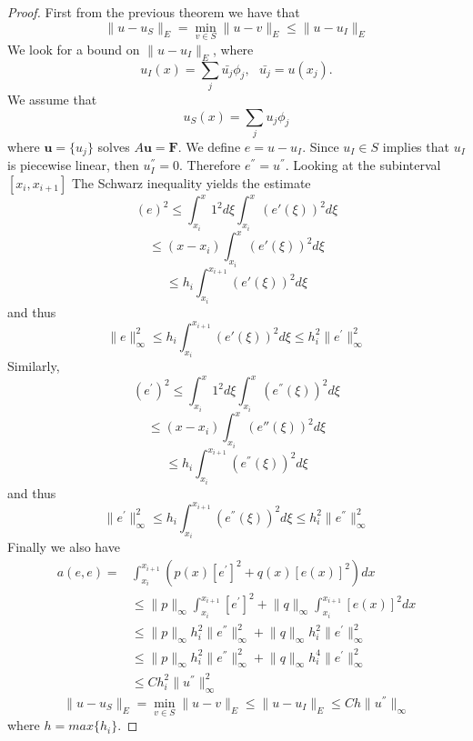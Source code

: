 \begin{proof}
First from the previous theorem we have that
\[\lVert u-u_S\rVert_E = \min_{v\in S}\lVert u-v\rVert_E \leq \lVert u-u_I\rVert_E\]
We look for a bound on $\lVert u-u_I\rVert_E$, where 
\[u_{I}(x) = \sum_j \bar{u_j} \phi_j, \ \ \ \bar{u_j}=u(x_j). \]
We assume that 
\[u_{S}(x) = \sum_j u_j \phi_j\] 
where $\mathbf{u}=\{u_j\}$ solves $A\mathbf{u}=\mathbf{F}$.
We define $e=u-u_I$. Since $u_I\in S$ implies that $u_I$ is piecewise
linear, then $u^{''}_I=0$. Therefore $e^{''}=u^{''}$.
Looking at the subinterval $[x_i,x_{i+1}]$
The Schwarz inequality yields the estimate
\[(e)^2 \leq \int_{x_i}^x 1^2 d \xi \int_{x_i}^{x}(e'(\xi))^2d \xi \]
\[ \leq (x-x_i) \int_{x_i}^{x}(e'(\xi))^2d \xi \]
\[ \leq h_i \int_{x_i}^{x_{i+1}}(e'(\xi))^2d \xi \]
and thus 
\[\lVert e\rVert ^2_{\infty} \leq  h_i \int_{x_i}^{x_{i+1}}(e'(\xi))^2d \xi\leq h_i^2 \lVert e^{'}\rVert ^2_{\infty} \]
Similarly,
\[(e^{'})^2 \leq \int_{x_i}^x 1^2 d \xi \int_{x_i}^{x}(e^{''}(\xi))^2d \xi \]
\[ \leq (x-x_i) \int_{x_i}^{x}(e{''}(\xi))^2d \xi \]
\[ \leq h_i \int_{x_i}^{x_{i+1}}(e^{''}(\xi))^2d \xi \]
and thus 
\[\lVert e^{'}\rVert ^2_{\infty} \leq  h_i \int_{x_i}^{x_{i+1}}(e^{''}(\xi))^2d \xi\leq h_i^2 \lVert e^{''}\rVert ^2_{\infty} \]
Finally we also have
\[
\begin{array}{ll}
a(e,e) =& \int_{x_i}^{x_{i+1}} (p(x)[e^{'}]^2 +q(x)[e(x)]^2)dx \\
& \leq \lVert p\rVert_{\infty}\int_{x_i}^{x_{i+1}} [e^{'}]^2 +\lVert q\rVert_{\infty}\int_{x_i}^{x_{i+1}} [e(x)]^2dx \\
& \leq \lVert p\rVert_{\infty}h_i^2 \lVert e^{''}\rVert ^2_{\infty}+\lVert q\rVert_{\infty}h_i^2 \lVert e^{'}\rVert ^2_{\infty} \\
& \leq \lVert p\rVert_{\infty}h_i^2 \lVert e^{''}\rVert ^2_{\infty}+\lVert q\rVert_{\infty}h_i^4 \lVert e^{'}\rVert ^2_{\infty} \\
& \leq C h_i^2 \lVert u^{''}\rVert ^2_{\infty}
\end{array}
\]
\[\lVert u-u_S\rVert_E = \min_{v\in S}\lVert u-v\rVert_E \leq \lVert u-u_I\rVert_E \leq C h \lVert u^{''}\rVert_{\infty}
 \]
where $h=max\{h_{i}\}$.
\end{proof}


